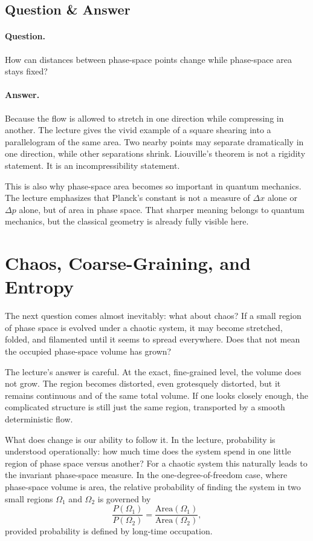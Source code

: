 \subsection{Question \& Answer}

\paragraph{Question.} How can distances between phase-space points change while phase-space area stays fixed?

\paragraph{Answer.} Because the flow is allowed to stretch in one direction while compressing in another. The lecture gives the vivid example of a square shearing into a parallelogram of the same area. Two nearby points may separate dramatically in one direction, while other separations shrink. Liouville's theorem is not a rigidity statement. It is an incompressibility statement.

This is also why phase-space area becomes so important in quantum mechanics. The lecture emphasizes that Planck's constant is not a measure of \(\Delta x\) alone or \(\Delta p\) alone, but of area in phase space. That sharper meaning belongs to quantum mechanics, but the classical geometry is already fully visible here.

\section{Chaos, Coarse-Graining, and Entropy}

The next question comes almost inevitably: what about chaos? If a small region of phase space is evolved under a chaotic system, it may become stretched, folded, and filamented until it seems to spread everywhere. Does that not mean the occupied phase-space volume has grown?

The lecture's answer is careful. At the exact, fine-grained level, the volume does not grow. The region becomes distorted, even grotesquely distorted, but it remains continuous and of the same total volume. If one looks closely enough, the complicated structure is still just the same region, transported by a smooth deterministic flow.

What does change is our ability to follow it. In the lecture, probability is understood operationally: how much time does the system spend in one little region of phase space versus another? For a chaotic system this naturally leads to the invariant phase-space measure. In the one-degree-of-freedom case, where phase-space volume is area, the relative probability of finding the system in two small regions \(\Omega_1\) and \(\Omega_2\) is governed by
\begin{equation}
\frac{P(\Omega_1)}{P(\Omega_2)}
=
\frac{\mathrm{Area}(\Omega_1)}{\mathrm{Area}(\Omega_2)},
\end{equation}
provided probability is defined by long-time occupation.

